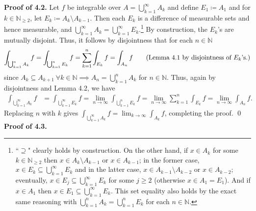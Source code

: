 \newpage\noindent \textbf{Proof of 4.2.} Let \( f \) be integrable over \( A = \bigcup_{k=1}^{\infty} A_{k}  \) and define \( E_1 \coloneqq A_1 \) and for \( k \in \mathbb{N}_{\geq 2}  \), let \( E_{k} \coloneqq A_{k} \setminus A_{k-1}  \). Then each \( E_{k}  \) is a difference of measurable sets and hence measurable, and \( \bigcup_{k=1}^{\infty} A_{k} = \bigcup_{k=1}^{\infty} E_{k}  \).\footnote{``$\supseteq$" clearly holds by construction. On the other hand, if \( x \in A_{k}  \) for some \( k \in \mathbb{N}_{\geq 2}  \) then \( x \in A_{k} \setminus A_{k-1}  \) or \( x \in A_{k-1}  \); in the former case, \( x \in E_{k} \subseteq \bigcup_{k=1}^{\infty} E_{k}   \) and in the latter case, \( x \in A_{k-1} \setminus A_{k-2}  \) or \( x \in A_{k-2}  \); eventually, \( x \in E_{j} \subseteq \bigcup_{k=1}^{\infty} E_{k} \) for some \( j \geq 2 \) (otherwise \( x \in A_1=E_1 \)). And if \( x \in A_1 \) then \( x \in E_1 \subseteq \bigcup_{k=1}^{\infty} E_{k}  \). This set equality also holds by the exact same reasoning with \( \bigcup_{k=1}^{n} A_{k} = \bigcup_{k=1}^{n} E_{k}  \) for each \( n \in \mathbb{N}  \).} By construction, the \( E_{k}  \)'s are mutually disjoint. Thus, it follows by disjointness that for each \( n \in \mathbb{N}  \)
\begin{align*}
	\int_{\bigcup_{k=1}^{n} A_{k}  } f = \int_{\bigcup_{k=1}^{n} E_{k} } f = \sum_{k=1}^{n} \int_{E_{k} } f = \int_{A_{n} } f  \tag{Lemma 4.1 by disjointness of \( E_{k} \)'s.}
\end{align*}
since \( A_{k} \subseteq A_{k+1} \ \forall k \in \mathbb{N} \implies A_{n} = \bigcup_{k=1}^{n} A_{k}  \) for \( n \in \mathbb{N}  \). Thus, again by disjointness and Lemma 4.2, we have
\begin{align*}
	\int_{\bigcup_{k=1}^{\infty} A_{k} } f &= \int_{\bigcup_{k=1}^{\infty} E_{k} } f= \lim_{{n} \to {\infty}} \int_{\bigcup_{k=1}^{n}E_{k}  }  f = \lim_{{n} \to {\infty}} \sum_{k=1}^{n}\int_{E_{k} } f = \lim_{{n} \to {\infty}} \int_{A_{n} } f.  
\end{align*}
Replacing \( n \) with \( k \) gives \( \int_{\bigcup_{k=1}^{\infty} A_{k} } f = \lim_{{k} \to {\infty}} \int_{A_{k} } f \), completing the proof. \qed \\

\noindent \textbf{Proof of 4.3.} 

